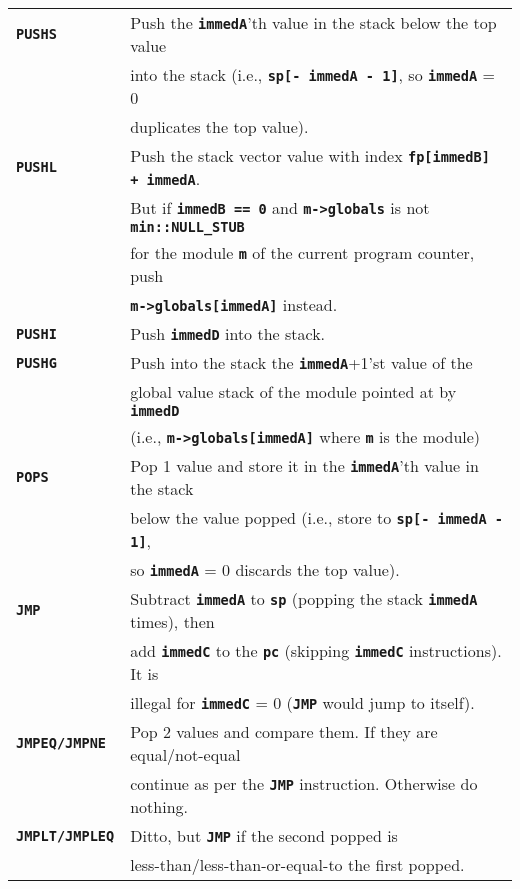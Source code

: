 \documentclass[12pt]{article}
\newcommand{\TT}[1]{{\tt \bfseries #1}}
\newlength{\figurewidth}
\newenvironment{boxedfigure}[1][!btp]%
	{\begin{figure*}[#1]
	 \begin{lrbox}{\figurebox}
	 \begin{minipage}{\figurewidth}

	 \vspace*{1ex}}%
	{
	 \vspace*{1ex}

	 \end{minipage}
	 \end{lrbox}

	 \centering
	 \fbox{\hspace*{0.1in}\usebox{\figurebox}\hspace*{0.1in}}
	 \end{figure*}}
\begin{document}
\begin{boxedfigure}

\begin{center}
\begin{tabular}{|l|l|}
\hline
\TT{PUSHS}
    & Push the \TT{immedA}'th value in the stack below the top value \\
    & into the stack (i.e., \TT{sp[- immedA - 1]},
      so \TT{immedA} = 0 \\
    & duplicates the top value).
\\\hline
\TT{PUSHL}
    & Push the stack vector value with index \TT{fp[immedB] + immedA}. \\
    & But if \TT{immedB == 0} and \TT{m->globals} is not \TT{min::NULL\_STUB} \\
    & for the module \TT{m} of the current program counter, push \\
    & \TT{m->globals[immedA]} instead.
\\\hline
\TT{PUSHI}
    & Push \TT{immedD} into the stack.
\\\hline
\TT{PUSHG}
    & Push into the stack the \TT{immedA}+1'st value of the \\
    & global value stack of the module pointed at by \TT{immedD} \\
    & (i.e., \TT{m->globals[immedA]} where \TT{m} is the module)
\\\hline
\TT{POPS}
    & Pop 1 value and store it in the \TT{immedA}'th value in the stack \\
    & below the value popped (i.e., store to \TT{sp[- immedA - 1]}, \\
    & so \TT{immedA} = 0 discards the top value).
\\\hline
\TT{JMP}
    & Subtract \TT{immedA} to \TT{sp} (popping the stack \TT{immedA} times),
      then \\
    & add \TT{immedC} to the \TT{pc} (skipping \TT{immedC} instructions).
      It is \\
    & illegal for \TT{immedC} = 0 (\TT{JMP} would jump to itself).
\\\hline
\TT{JMPEQ/JMPNE}
    & Pop 2 values and compare them.  If they are equal/not-equal \\
    & continue as per the \TT{JMP} instruction.  Otherwise do nothing.
\\\hline
\TT{JMPLT/JMPLEQ}
    & Ditto, but \TT{JMP} if the second popped is \\
    & less-than/less-than-or-equal-to the first popped.
\\\hline

\end{tabular}
\end{center}
\end{boxedfigure}
\end{document}
